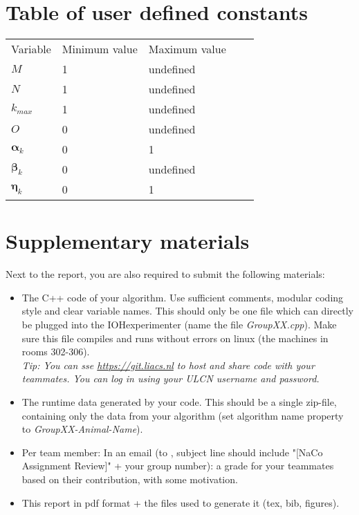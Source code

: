 \documentclass[runningheads]{llncs}
\begin{document}
\appendix
\section{Table of user defined constants}
\label{AppA}
\begin{table}[]
\begin{tabular}{|l|l|l|ll}
\cline{1-3}
Variable & Minimum value & Maximum value &  &  \\  \cline{1-3}
$M$  & 1   & undefined   &  &  \\  \cline{1-3}
$N$ & 1 & undefined & & \\ \cline{1-3}
$ k_{max} $ & 1 & undefined &  &  \\  \cline{1-3}
$ O $   & 0    & undefined &  &   \\  \cline{1-3}
$ \boldsymbol{\alpha}_k $ &  0 & 1 &  &  \\  \cline{1-3}
$ \boldsymbol{\beta}_k $ & 0 & undefined &  &  \\  \cline{1-3}
$ \boldsymbol{\eta}_k $ & 0 & 1 &  & \\  \cline{1-3}
\end{tabular}
\end{table}


\section{Supplementary materials}
Next to the report, you are also required to submit the following materials:
\begin{itemize}
    \item The C++ code of your algorithm. Use sufficient comments, modular coding style and clear variable names. This should only be one file which can directly be plugged into the IOHexperimenter (name the file \textit{GroupXX.cpp}). Make sure this file compiles and runs without errors on linux (the machines in rooms 302-306).\\
    \textit{Tip: You can sse \url{https://git.liacs.nl} to host and share code with your teammates. You can log in using your ULCN username and password.}
    \item The runtime data generated by your code. This should be a single zip-file, containing only the data from your algorithm (set algorithm name property to \textit{GroupXX-Animal-Name}).
    \item Per team member: In an email (to \href{mailto:d.l.vermetten@liacs.leidenuniv.nl}{}, subject line should include "[NaCo Assignment Review]" + your group number): a grade for your teammates based on their contribution, with some motivation. 
    \item This report in pdf format + the files used to generate it (tex, bib, figures). 
\end{itemize}
\end{document}
